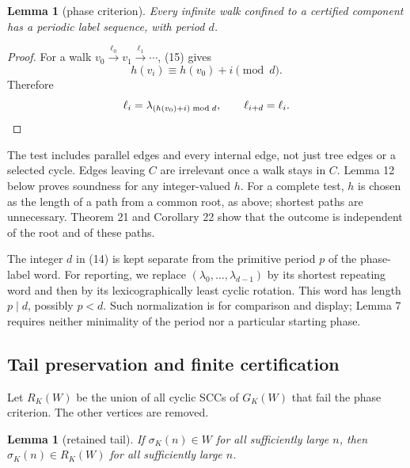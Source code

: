 \documentclass[11pt,reqno]{amsart}
\newtheorem{lemma}[theorem]{Lemma}
\theoremstyle{definition}
\theoremstyle{remark}
\begin{document}
\begin{samepage}
\begin{lemma}[phase criterion]\leavevmode\label{thm:7}
Every infinite walk confined to a certified
component has a periodic label sequence, with period \(d\).
\label{thm-end:7}
\end{lemma}
\end{samepage}

\begin{proof}\leavevmode\label{proof:7}
For a walk
\(v_0\xrightarrow{\ell_0}v_1\xrightarrow{\ell_1}\cdots\), (15) gives
\[
h(v_i)\equiv h(v_0)+i\pmod d.
\]
Therefore
\[
\ell_i=\lambda_{(h(v_0)+i)\bmod d},
\qquad \ell_{i+d}=\ell_i.\qedhere
\]
\end{proof}

The test includes parallel edges and every internal edge, not just tree
edges or a selected cycle. Edges leaving \(C\) are irrelevant once a
walk stays in \(C\). Lemma 12 below proves soundness for any
integer-valued \(h\). For a complete test, \(h\) is chosen as the
length of a path from a common root, as above; shortest paths are
unnecessary. Theorem 21 and Corollary 22 show that the outcome is
independent of the root and of these paths.

The integer \(d\) in (14) is kept separate from the primitive period
\(p\) of the phase-label word. For reporting, we replace
\((\lambda_0,\ldots,\lambda_{d-1})\) by its shortest repeating word and
then by its lexicographically least cyclic rotation. This word has length
\(p\mid d\), possibly \(p<d\). Such normalization is for comparison
and display; Lemma 7 requires neither minimality of the period nor a
particular starting phase.

\subsection{Tail preservation and finite certification}\label{sec:3.3}

Let \(R_K(W)\) be the union of all cyclic SCCs of \(G_K(W)\) that fail
the phase criterion. The other vertices are removed.

\begin{samepage}
\begin{lemma}[retained tail]\leavevmode\label{thm:8}
If \(\sigma_K(n)\in W\) for all sufficiently
large \(n\), then \(\sigma_K(n)\in R_K(W)\) for all sufficiently large
\(n\).
\label{thm-end:8}
\end{lemma}
\end{samepage}
\end{document}
